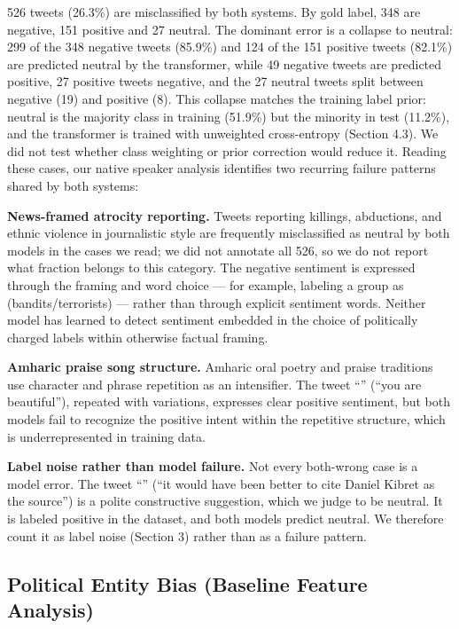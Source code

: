 526 tweets (26.3\%) are misclassified by both systems. By gold label, 348 are negative, 151 positive and 27 neutral. The dominant error is a collapse to neutral: 299 of the 348 negative tweets (85.9\%) and 124 of the 151 positive tweets (82.1\%) are predicted neutral by the transformer, while 49 negative tweets are predicted positive, 27 positive tweets negative, and the 27 neutral tweets split between negative (19) and positive (8). This collapse matches the training label prior: neutral is the majority class in training (51.9\%) but the minority in test (11.2\%), and the transformer is trained with unweighted cross-entropy (Section 4.3). We did not test whether class weighting or prior correction would reduce it. Reading these cases, our native speaker analysis identifies two recurring failure patterns shared by both systems:

\textbf{News-framed atrocity reporting.} Tweets reporting killings, abductions, and ethnic violence in journalistic style are frequently misclassified as neutral by both models in the cases we read; we did not annotate all 526, so we do not report what fraction belongs to this category. The negative sentiment is expressed through the framing and word choice --- for example, labeling a group as  (bandits/terrorists) --- rather than through explicit sentiment words. Neither model has learned to detect sentiment embedded in the choice of politically charged labels within otherwise factual framing.

\textbf{Amharic praise song structure.} Amharic oral poetry and praise traditions use character and phrase repetition as an intensifier. The tweet ``'' (``you are beautiful''), repeated with variations, expresses clear positive sentiment, but both models fail to recognize the positive intent within the repetitive structure, which is underrepresented in training data.

\textbf{Label noise rather than model failure.} Not every both-wrong case is a model error. The tweet ``'' (``it would have been better to cite Daniel Kibret as the source'') is a polite constructive suggestion, which we judge to be neutral. It is labeled positive in the dataset, and both models predict neutral. We therefore count it as label noise (Section 3) rather than as a failure pattern.

\subsection{Political Entity Bias (Baseline Feature Analysis)}

